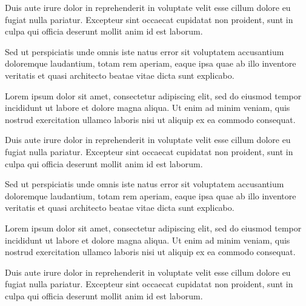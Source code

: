 \documentclass{memoir}
\begin{document}
Duis aute irure dolor in reprehenderit in voluptate velit esse cillum dolore eu fugiat nulla pariatur. Excepteur sint occaecat cupidatat non proident, sunt in culpa qui officia deserunt mollit anim id est laborum.

Sed ut perspiciatis unde omnis iste natus error sit voluptatem accusantium doloremque laudantium, totam rem aperiam, eaque ipsa quae ab illo inventore veritatis et quasi architecto beatae vitae dicta sunt explicabo.

Lorem ipsum dolor sit amet, consectetur adipiscing elit, sed do eiusmod tempor incididunt ut labore et dolore magna aliqua. Ut enim ad minim veniam, quis nostrud exercitation ullamco laboris nisi ut aliquip ex ea commodo consequat.

Duis aute irure dolor in reprehenderit in voluptate velit esse cillum dolore eu fugiat nulla pariatur. Excepteur sint occaecat cupidatat non proident, sunt in culpa qui officia deserunt mollit anim id est laborum.

Sed ut perspiciatis unde omnis iste natus error sit voluptatem accusantium doloremque laudantium, totam rem aperiam, eaque ipsa quae ab illo inventore veritatis et quasi architecto beatae vitae dicta sunt explicabo.

Lorem ipsum dolor sit amet, consectetur adipiscing elit, sed do eiusmod tempor incididunt ut labore et dolore magna aliqua. Ut enim ad minim veniam, quis nostrud exercitation ullamco laboris nisi ut aliquip ex ea commodo consequat.

Duis aute irure dolor in reprehenderit in voluptate velit esse cillum dolore eu fugiat nulla pariatur. Excepteur sint occaecat cupidatat non proident, sunt in culpa qui officia deserunt mollit anim id est laborum.
\end{document}
